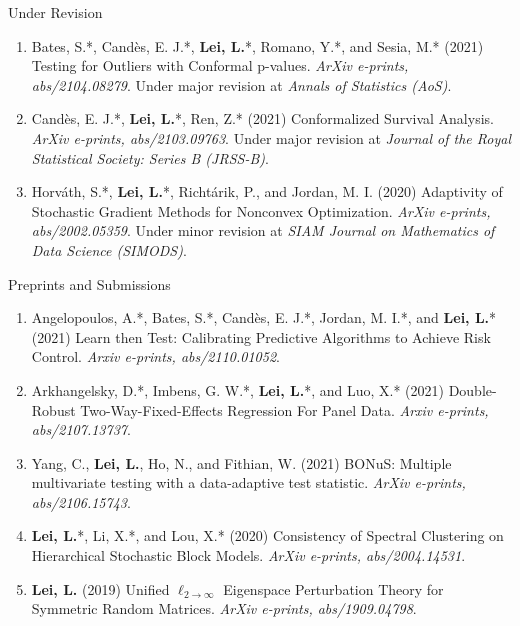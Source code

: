 \documentclass{article}
\begin{document}
\begin{large}
\noindent Under Revision
\end{large}

\begin{enumerate}
\item Bates, S.*, Cand\`{e}s, E. J.*, \textbf{Lei, L.}*, Romano, Y.*, and Sesia, M.* (2021) Testing for Outliers with Conformal p-values. \emph{ArXiv e-prints, abs/2104.08279}. Under major revision at \emph{Annals of Statistics (AoS)}.
\item Cand\`{e}s, E. J.*, \textbf{Lei, L.}*, Ren, Z.* (2021) Conformalized Survival Analysis. \emph{ArXiv e-prints, abs/2103.09763}. Under major revision at \emph{Journal of the Royal Statistical Society: Series B (JRSS-B)}.
\item Horv\'{a}th, S.*, \textbf{Lei, L.}*, Richt\'{a}rik, P., and Jordan, M. I. (2020) Adaptivity of Stochastic Gradient Methods for Nonconvex Optimization. \emph{ArXiv e-prints, abs/2002.05359}. Under minor revision at \emph{SIAM Journal on Mathematics of Data Science (SIMODS)}.
\end{enumerate}

\begin{large}
\noindent Preprints and Submissions
\end{large}

\begin{enumerate}
\item Angelopoulos, A.*, Bates, S.*, Cand\`{e}s, E. J.*, Jordan, M. I.*, and \textbf{Lei, L.}* (2021) Learn then Test: Calibrating Predictive Algorithms to Achieve Risk Control. \emph{Arxiv e-prints, abs/2110.01052}.
\item Arkhangelsky, D.*, Imbens, G. W.*, \textbf{Lei, L.}*, and Luo, X.* (2021) Double-Robust Two-Way-Fixed-Effects Regression For Panel Data. \emph{Arxiv e-prints, abs/2107.13737}.
\item Yang, C., \textbf{Lei, L.}, Ho, N., and Fithian, W. (2021) BONuS: Multiple multivariate testing with a data-adaptive test statistic. \emph{ArXiv e-prints, abs/2106.15743}.
\item \textbf{Lei, L.}*, Li, X.*, and Lou, X.* (2020) Consistency of Spectral Clustering on Hierarchical Stochastic Block Models. \emph{ArXiv e-prints, abs/2004.14531}.
\item \textbf{Lei, L.} (2019) Unified $\ell_{2\rightarrow\infty}$ Eigenspace Perturbation Theory for Symmetric Random Matrices. \emph{ArXiv e-prints, abs/1909.04798}.
\end{enumerate}
\end{document}
